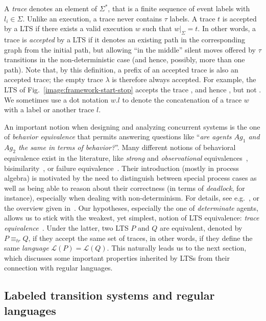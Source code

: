 A \emph{trace} denotes an element of $\Sigma^*$, that is a finite sequence of event labels  with $l_i \in \Sigma$. Unlike an execution, a trace never contains $\tau$ labels. A trace $t$ is accepted by a LTS if there exists a valid execution $w$ such that $w|_{\Sigma} = t$. In other words, a trace is \emph{accepted} by a LTS if it denotes an existing path in the corresponding graph from the initial path, but allowing ``in the middle'' silent moves offered by $\tau$ transitions in the non-deterministic case (and hence, possibly, more than one path). Note that, by this definition, a prefix of an accepted trace is also an accepted trace; the empty trace $\lambda$ is therefore always accepted. For example, the LTS of Fig.~\ref{image:framework-start-stop} accepts the trace , and hence , but not . We sometimes use a dot notation $w.l$ to denote the concatenation of a trace $w$ with a label or another trace $l$.

An important notion when designing and analyzing concurrent systems is the one of \emph{behavior equivalence} that permits answering questions like ``\emph{are agents $Ag_1$ and $Ag_2$ the same in terms of behavior?}''. Many different notions of behavioral equivalence exist in the literature, like \emph{strong} and \emph{observational}  equivalences~\cite{Milner:1989}, bisimilarity~\cite{Park:1981}, or failure equivalence~\cite{Hoare:1985}. Their introduction (mostly in process algebra) is motivated by the need to distinguish between special process cases as well as being able to reason about their correctness (in terms of \emph{deadlock}, for instance), especially when dealing with non-determinism. For details, see e.g.~\cite[chap. 3]{Hoare:1985}, \cite[chap. 4 \& 5]{Milner:1989} or the overview given in~\cite{Fernandez:1991}. Our hypotheses, especially the one of \emph{determinate} agents, allows us to stick with the weakest, yet simplest, notion of LTS equivalence: \emph{trace equivalence}~\cite{Hoare:1985, Engelfriet:1985}. Under the latter, two LTS $P$ and $Q$ are equivalent, denoted by $P \equiv_{tr} Q$, if they accept the same set of traces, in other words, if they define the same \emph{language} $\mathcal{L}(P) = \mathcal{L}(Q)$. This naturally leads us to the next section, which discusses some important properties inherited by LTSs from their connection with regular languages. 

\subsection{Labeled transition systems and regular languages\label{section:background-lts-and-regular-languages}}

